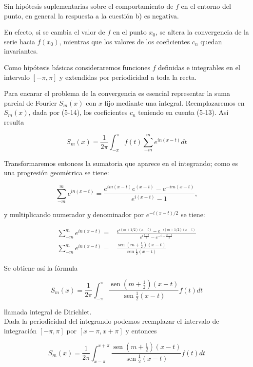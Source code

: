 \documentclass[10pt]{article}
\theoremstyle{plain}
\theoremstyle{definition}
\theoremstyle{remark}
\begin{document}
Sin hipótesis suplementarias sobre el comportamiento de $f$ en el entorno del punto, en general la respuesta a la cuestión b) es negativa.

En efecto, si se cambia el valor de $f$ en el punto $x_{0}$, se altera la convergencia de la serie hacia $f\left(x_{0}\right)$, mientras que los valores de los coeficientes $c_{n}$ quedan invariantes.

Como hipótesis básicas consideraremos funciones $f$ definidas e integrables en el intervalo $[-\pi, \pi]$ y extendidas por periodicidad a toda la recta.

Para encarar el problema de la convergencia es esencial representar la suma parcial de Fourier $S_{m}(x)$ con $x$ fijo mediante una integral. Reemplazaremos en $S_{m}(x)$, dada por (5-14), los coeficientes $c_{n}$ teniendo en cuenta (5-13). Así resulta

$$
S_{m}(x)=\frac{1}{2 \pi} \int_{-\pi}^{\pi} f(t) \sum_{-m}^{m} e^{i n(x-t)} d t
$$

Transformaremos entonces la sumatoria que aparece en el integrando; como es una progresión geométrica se tiene:

$$
\sum_{-m}^{m} e^{i n(x-t)}=\frac{e^{i m(x-t)} e^{(x-t)}-e^{-i m(x-t)}}{e^{i(x-t)}-1},
$$

y multiplicando numerador $y$ denominador por $e^{-i(x-t) / 2}$ se tiene:

$$
\begin{aligned}
\sum_{-m}^{m} e^{i n(x-t)}= & \frac{e^{i(m+1 / 2)(x-t)}-e^{-i(m+1 / 2)(x-t)}}{e^{i \frac{x-t}{2}}-e^{-i-\frac{x-1}{2}}} \\
\sum_{-m}^{m} e^{i n(x-t)}= & \frac{\operatorname{sen}\left(m+\frac{1}{2}\right)(x-t)}{\operatorname{sen} \frac{1}{2}(x-t)}
\end{aligned}
$$

Se obtiene así la fórmula


\begin{equation*}
S_{m}(x)=\frac{1}{2 \pi} \int_{-\pi}^{\pi} \frac{\operatorname{sen}\left(m+\frac{1}{2}\right)(x-t)}{\operatorname{sen} \frac{1}{2}(x-t)} f(t) d t \tag{5-15}
\end{equation*}


llamada integral de Dirichlet.\\
Dada la periodicidad del integrando podemos reemplazar el intervalo de integración $[-\pi, \pi]$ por $[x-\pi, x+\pi]$ y entonces

$$
S_{m}(x)=\frac{1}{2 \pi} \int_{x-\pi}^{x+\pi} \frac{\operatorname{sen}\left(m+\frac{1}{2}\right)(x-t)}{\operatorname{sen} \frac{1}{2}(x-t)} f(t) d t
$$
\end{document}
